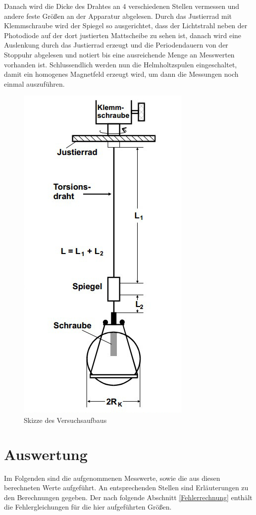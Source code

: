     Danach wird die Dicke des Drahtes an 4 verschiedenen Stellen vermessen und 
    andere feste Größen an der Apparatur abgelesen.
    Durch das Justierrad mit Klemmschraube wird der Spiegel so ausgerichtet, dass der 
    Lichtstrahl neben der Photodiode auf der dort justierten Mattscheibe zu sehen ist, danach wird 
    eine Auslenkung durch das Justierrad erzeugt und die Periodendauern von der Stoppuhr abgelesen und notiert bis 
    eine ausreichende Menge an Messwerten vorhanden ist.  
    Schlussendlich werden nun die Helmholtzspulen eingeschaltet, damit ein homogenes 
    Magnetfeld erzeugt wird, um dann die Messungen noch einmal auszuführen.
    \begin{figure}[b]
          \centering
          \includegraphics*[scale = 0.75]{Grafik/Versuchsaufbau.jpg}%
          \caption{Skizze des Versuchsaufbaus}
          \label{Aufbau}%
    \end{figure}    


  \section{Auswertung}
    \label{Auswertung}
    Im Folgenden sind die aufgenommenen Messwerte, sowie die aus diesen berechneten Werte
    aufgeführt. An entsprechenden Stellen sind Erläuterungen zu den Berechnungen gegeben.
    Der nach folgende Abschnitt \ref{Fehlerrechnung} enthält die Fehlergleichungen für die hier
    aufgeführten Größen.
    
